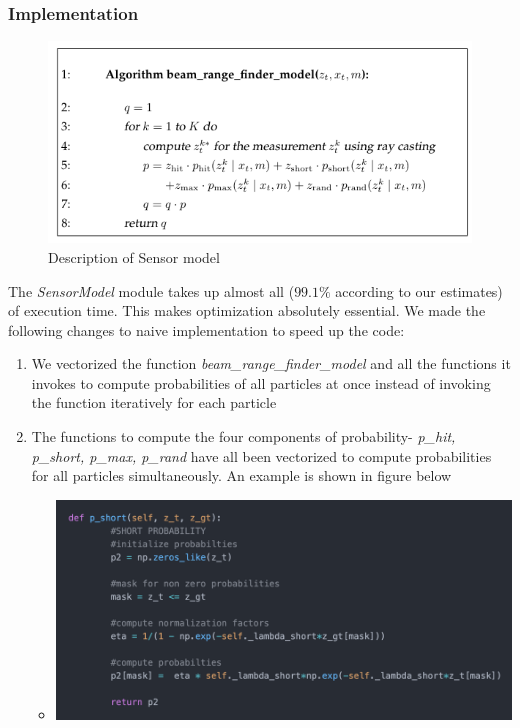 \documentclass[12pt, a4paper]{article}
\begin{document}
\subsubsection{Implementation}
\begin{figure}[H]
  \centering
  \includegraphics[width=0.9\linewidth]{results/sensor_model_desc.png}
  \caption{Description of Sensor model}
\end{figure}
The \textit{SensorModel} module takes up almost all ($99.1\%$ according to our estimates) of execution time. This makes optimization absolutely essential. We made the following changes to naive implementation to speed up the code:
\begin{enumerate}
  \item We vectorized the function \textit{beam\_range\_finder\_model} and all the functions it invokes to compute probabilities of all particles at once instead of invoking the function iteratively for each particle
  \item The functions to compute the four components of probability- \textit{p\_hit, p\_short, p\_max, p\_rand} have all been vectorized to compute probabilities for all particles simultaneously. An example is shown in figure below
  \begin{itemize}
    \item 
    \begin{minipage}[t]{\linewidth}
      \vspace{0pt}
      \begin{center}
        \includegraphics[scale=0.3]{./results/sensor_model_opt.png}
        \label{fig:sm_1}
      \end{center}
    \end{minipage}
  \end{itemize}
\end{enumerate}
\end{document}
